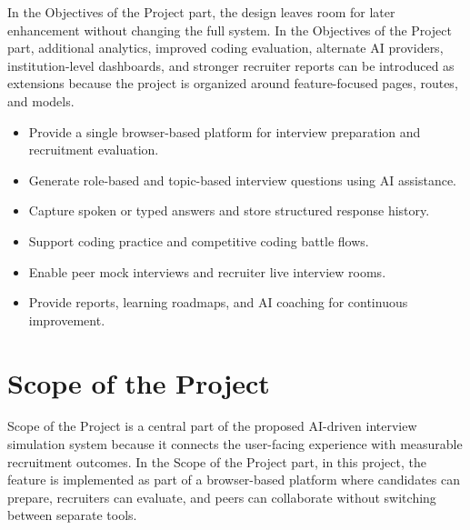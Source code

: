 \documentclass[12pt,a4paper]{report}
\begin{document}
In the Objectives of the Project part, the design leaves room for later enhancement without changing the full system. In the Objectives of the Project part, additional analytics, improved coding evaluation, alternate AI providers, institution-level dashboards, and stronger recruiter reports can be introduced as extensions because the project is organized around feature-focused pages, routes, and models.


\begin{itemize}
\item Provide a single browser-based platform for interview preparation and recruitment evaluation.
\end{itemize}

\begin{itemize}
\item Generate role-based and topic-based interview questions using AI assistance.
\end{itemize}

\begin{itemize}
\item Capture spoken or typed answers and store structured response history.
\end{itemize}

\begin{itemize}
\item Support coding practice and competitive coding battle flows.
\end{itemize}

\begin{itemize}
\item Enable peer mock interviews and recruiter live interview rooms.
\end{itemize}

\begin{itemize}
\item Provide reports, learning roadmaps, and AI coaching for continuous improvement.
\end{itemize}

\section{Scope of the Project}

Scope of the Project is a central part of the proposed AI-driven interview simulation system because it connects the user-facing experience with measurable recruitment outcomes. In the Scope of the Project part, in this project, the feature is implemented as part of a browser-based platform where candidates can prepare, recruiters can evaluate, and peers can collaborate without switching between separate tools.
\end{document}
